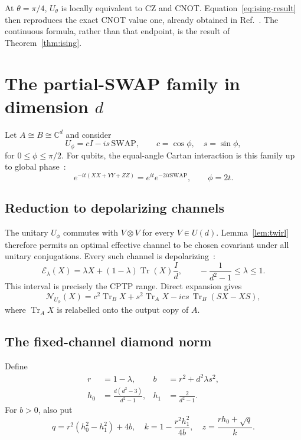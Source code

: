 \documentclass[11pt,a4paper]{article}
\theoremstyle{remark}
\newcommand{\Tr}{\operatorname{Tr}}
\newcommand{\cE}{\mathcal{E}}
\newcommand{\cN}{\mathcal{N}}
\newcommand{\SWAP}{\mathrm{SWAP}}
\begin{document}
At $\theta=\pi/4$, $U_\theta$ is locally equivalent to CZ and CNOT.
Equation~\eqref{eq:ising-result} then reproduces the exact CNOT value one,
already obtained in Ref.~\cite{barsse2025}.  The continuous
formula, rather than that endpoint, is the result of
Theorem~\ref{thm:ising}.

\section{The partial-SWAP family in dimension \texorpdfstring{$d$}{d}}

Let $A\cong B\cong\mathbb{C}^d$ and consider
\begin{equation}
 U_\phi=cI-is\,\SWAP,\qquad c=\cos\phi,\quad s=\sin\phi,
 \label{eq:partial-swap}
\end{equation}
for $0\leq\phi\leq\pi/2$.  For qubits, the equal-angle Cartan interaction is
this family up to global phase~\cite{zhang2003}:
\[
 e^{-it(XX+YY+ZZ)}=e^{it}e^{-2it\SWAP},\qquad \phi=2t.
\]

\subsection{Reduction to depolarizing channels}

The unitary $U_\phi$ commutes with $V\otimes V$ for every $V\in U(d)$.
Lemma~\ref{lem:twirl} therefore permits an optimal effective channel to be
chosen covariant under all unitary conjugations.  Every such channel is
depolarizing~\cite{watrous2018}:
\begin{equation}
 \cE_\lambda(X)
 =\lambda X+(1-\lambda)\Tr(X)\frac{I}{d},
 \qquad -\frac{1}{d^2-1}\leq\lambda\leq1.
 \label{eq:depol}
\end{equation}
This interval is precisely the CPTP range.  Direct expansion gives
\[
 \cN_{U_\phi}(X)
 =c^2\Tr_BX+s^2\Tr_AX-ics\,\Tr_B(SX-XS),
\]
where $\Tr_A X$ is relabelled onto the output copy of $A$.

\subsection{The fixed-channel diamond norm}

Define
\begin{align}
 r&=1-\lambda,&
 b&=r^2+d^2\lambda s^2,\nonumber\\
 h_0&=\frac{d(d^2-3)}{d^2-1},&
 h_1&=\frac{2}{d^2-1}.
 \label{eq:general-terms}
\end{align}
For $b>0$, also put
\begin{equation}
 q=r^2(h_0^2-h_1^2)+4b,\quad
 k=1-\frac{r^2h_1^2}{4b},\quad
 z=\frac{rh_0+\sqrt q}{k}.
 \label{eq:general-D}
\end{equation}
\end{document}
